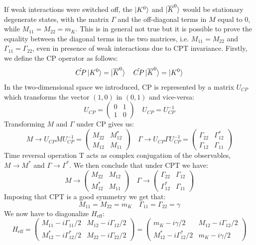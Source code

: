\documentclass[../main.tex]{subfiles}
\begin{document}
If weak interactions were switched off, the $\ket{K^0}$ and $\ket{\overline{K}^0}$ would be stationary degenerate states, with the matrix $\Gamma$ and the off-diagonal terms in $M$ equal to 0, while $M_{11}=M_{22}=m_K$. This is in general not true but it is possible to prove the equality between the diagonal terms in the two matrices, i.e. $M_{11}=M_{22}$ and $\Gamma_{11}=\Gamma_{22}$, even in presence of weak interactions due to CPT invariance. Firstly, we define the CP operator as follows:
\[
\hat{CP}\ket{K^0}=\ket{\overline{K}^0} \quad \hat{CP}\ket{\overline{K}^0}=\ket{K^0}
\]
In the two-dimensional space we introduced, CP is represented by a matrix $U_{CP}$ which transforms the vector $(1,0)$ in $(0,1)$ and vice-versa:
\[
U_{CP}=\left(\begin{array}{cc}
    0 & 1 \\
    1 & 0
\end{array}\right) \quad U_{CP}=U_{CP}^{-1}
\]
Transforming $M$ and $\Gamma$ under CP gives us:
\[
M\to U_{CP}MU_{CP}^{-1}=\left(\begin{array}{cc}
    M_{22} & M_{12}^* \\
    M_{12} & M_{11}
\end{array}\right) \quad \Gamma\to U_{CP}\Gamma U_{CP}^{-1}=\left(\begin{array}{cc}
    \Gamma_{22} & \Gamma_{12}^* \\
    \Gamma_{12} & \Gamma_{11}
\end{array}\right)
\]
Time reversal operation T acts as complex conjugation of the observables, $M\to M^*$ and $\Gamma\to\Gamma^*$. We then conclude that under CPT we have:
\[
M\to\left(\begin{array}{cc}
    M_{22} & M_{12} \\
    M_{12}^* & M_{11}
\end{array}\right) \quad \Gamma\to\left(\begin{array}{cc}
    \Gamma_{22} & \Gamma_{12} \\
    \Gamma_{12}^* & \Gamma_{11}
\end{array}\right)
\]
Imposing that CPT is a good symmetry we get that:
\[
M_{11}=M_{22}=m_K \quad \Gamma_{11}=\Gamma_{22}=\gamma
\]
We now have to diagonalize $H_{\text{eff}}$:
\[
H_{\text{eff}}=\left(\begin{array}{cc}
    M_{11}-i\Gamma_{11}/2 & M_{12}-i\Gamma_{12}/2 \\
    M_{12}^*-i\Gamma_{12}^*/2 & M_{22}-i\Gamma_{22}/2
\end{array}\right)=\left(\begin{array}{cc}
    m_K-i\gamma/2 & M_{12}-i\Gamma_{12}/2 \\
    M_{12}^*-i\Gamma_{12}^*/2 & m_K-i\gamma/2
\end{array}\right)
\]
\end{document}

